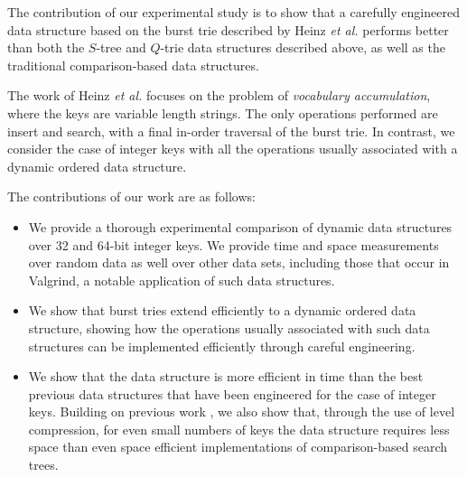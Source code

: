 \documentclass[]{acmtrans2m}
\begin{document}
The contribution of our experimental study is to show that a carefully engineered data structure based on the burst
trie described by Heinz \textit{et al.} \cite{Heinz+02} performs better than both the $S$-tree and $Q$-trie data structures
described above, as well as the traditional comparison-based data structures.

The work of 
Heinz \textit{et al.} focuses on the problem of \textit{vocabulary accumulation}, where the keys are variable length strings.
The only operations performed are insert and search, with a final in-order traversal of the burst trie.
In contrast, we consider the case of integer keys with all the operations usually associated with a dynamic
ordered data structure.

The contributions of our work are as follows:

\begin{itemize}
\item We provide a thorough experimental comparison of dynamic data structures over 32 and 64-bit integer keys.
      We provide time and space measurements over random data as well over other data sets, including those that occur in Valgrind, a
      notable application of such data structures.

\item We show that burst tries extend efficiently to a dynamic ordered data structure, showing how the operations usually associated
      with such data structures can be implemented efficiently through careful engineering.

\item We show that the data structure is more efficient in time than the best previous data structures that have been 
      engineered for the case of integer keys. Building on previous work \cite{NashGregg08}, we also show that, through the use of
      level compression, for even small numbers of keys the data structure requires less space than even space efficient implementations of comparison-based
      search trees. 
\end{itemize}
\end{document}
